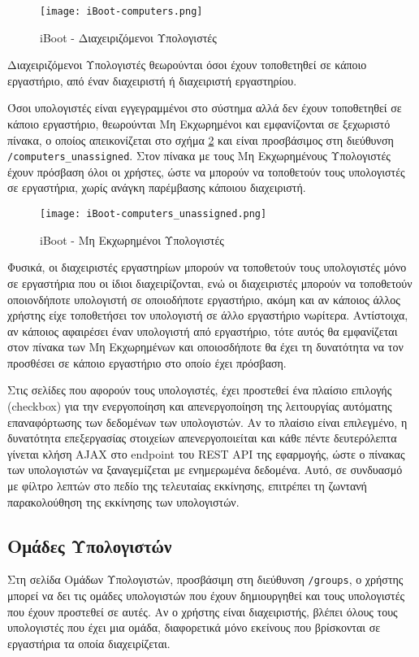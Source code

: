 \begin{figure}[ht]
	\centering
	\texttt{[image: iBoot-computers.png]}
	\caption{iBoot - Διαχειριζόμενοι Υπολογιστές}
	\label{fig:iBoot_computers}
\end{figure}
Διαχειριζόμενοι Υπολογιστές θεωρούνται όσοι έχουν τοποθετηθεί σε κάποιο εργαστήριο, από έναν διαχειριστή ή διαχειριστή εργαστηρίου.

Όσοι υπολογιστές είναι εγγεγραμμένοι στο σύστημα αλλά δεν έχουν τοποθετηθεί σε κάποιο εργαστήριο, θεωρούνται Μη Εκχωρημένοι και εμφανίζονται σε ξεχωριστό πίνακα, ο οποίος απεικονίζεται στο σχήμα \ref{fig:iBoot_computers_unassigned} και είναι προσβάσιμος στη διεύθυνση \verb!/computers_unassigned!. Στον πίνακα με τους Μη Εκχωρημένους Υπολογιστές έχουν πρόσβαση όλοι οι χρήστες, ώστε να μπορούν να τοποθετούν τους υπολογιστές σε εργαστήρια, χωρίς ανάγκη παρέμβασης κάποιου διαχειριστή.

\begin{figure}[ht]
	\centering
	\texttt{[image: iBoot-computers\_unassigned.png]}
	\caption{iBoot - Μη Εκχωρημένοι Υπολογιστές}
	\label{fig:iBoot_computers_unassigned}
\end{figure}
\FloatBarrier

Φυσικά, οι διαχειριστές εργαστηρίων μπορούν να τοποθετούν τους υπολογιστές μόνο σε εργαστήρια που οι ίδιοι διαχειρίζονται, ενώ οι διαχειριστές μπορούν να τοποθετούν οποιονδήποτε υπολογιστή σε οποιοδήποτε εργαστήριο, ακόμη και αν κάποιος άλλος χρήστης είχε τοποθετήσει τον υπολογιστή σε άλλο εργαστήριο νωρίτερα. Αντίστοιχα, αν κάποιος αφαιρέσει έναν υπολογιστή από εργαστήριο, τότε αυτός θα εμφανίζεται στον πίνακα των Μη Εκχωρημένων και οποιοσδήποτε θα έχει τη δυνατότητα να τον προσθέσει σε κάποιο εργαστήριο στο οποίο έχει πρόσβαση.

Στις σελίδες που αφορούν τους υπολογιστές, έχει προστεθεί ένα πλαίσιο επιλογής (checkbox) για την ενεργοποίηση και απενεργοποίηση της λειτουργίας αυτόματης επαναφόρτωσης των δεδομένων των υπολογιστών. Αν το πλαίσιο είναι επιλεγμένο, η δυνατότητα επεξεργασίας στοιχείων απενεργοποιείται και κάθε πέντε δευτερόλεπτα γίνεται κλήση AJAX στο endpoint του REST API της εφαρμογής, ώστε ο πίνακας των υπολογιστών να ξαναγεμίζεται με ενημερωμένα δεδομένα. Αυτό, σε συνδυασμό με φίλτρο λεπτών στο πεδίο της τελευταίας εκκίνησης, επιτρέπει τη ζωντανή παρακολούθηση της εκκίνησης των υπολογιστών.

\subsection{Ομάδες Υπολογιστών}
\FloatBarrier
Στη σελίδα Ομάδων Υπολογιστών, προσβάσιμη στη διεύθυνση \verb!/groups!, ο χρήστης μπορεί να δει τις ομάδες υπολογιστών που έχουν δημιουργηθεί και τους υπολογιστές που έχουν προστεθεί σε αυτές. Αν ο χρήστης είναι διαχειριστής, βλέπει όλους τους υπολογιστές που έχει μια ομάδα, διαφορετικά μόνο εκείνους που βρίσκονται σε εργαστήρια τα οποία διαχειρίζεται.

